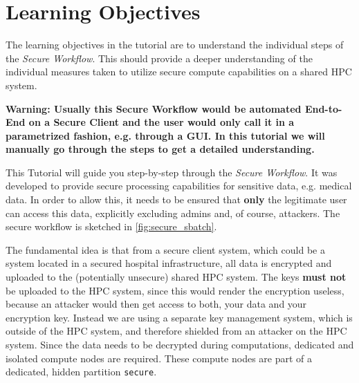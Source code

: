 \documentclass[paper=a4]{scrartcl}
\newcommand{\theexercisenumber}{1} %
\newcommand{\thedate}{\today} %
\begin{document}
\date{\thedate}
\exercise{\theexercisenumber}

\parskip 8pt
\makesheetheader

\section*{Learning Objectives}
The learning objectives in the tutorial are to understand the individual steps of the \textit{Secure Workflow}. This should provide a deeper understanding of the individual measures taken to utilize secure compute capabilities on a shared HPC system. 

\textbf{Warning: Usually this Secure Workflow would be automated End-to-End on a Secure Client and the user would only call it in a parametrized fashion, e.g. through a GUI. In this tutorial we will manually go through the steps to get a detailed understanding.}



\tableofcontents

\bigskip

This Tutorial will guide you step-by-step through the \textit{Secure Workflow}. 
It was developed to provide secure processing capabilities for sensitive data, e.g. medical data.
In order to allow this, it needs to be ensured that \textbf{only} the legitimate user can access this data, explicitly excluding admins and, of course, attackers. 
The secure workflow is sketched in \cref{fig:secure_sbatch}. 

The fundamental idea is that from a secure client system, which could be a system located in a secured hospital infrastructure, all data is encrypted and uploaded to the (potentially unsecure) shared HPC system.
The keys \textbf{must not} be uploaded to the HPC system, since this would render the encryption useless, because an attacker would then get access to both, your data and your encryption key. 
Instead we are using a separate key management system, which is outside of the HPC system, and therefore shielded from an attacker on the HPC system.
Since the data needs to be decrypted during computations, dedicated and isolated compute nodes are required. 
These compute nodes are part of a dedicated, hidden partition \texttt{secure}. 
\end{document}
